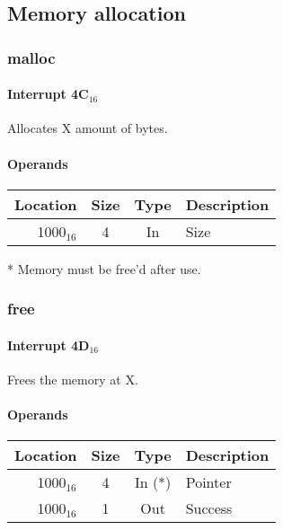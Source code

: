 \documentclass{article}
\begin{document}
\subsection{Memory allocation}

\subsubsection{malloc}

\paragraph{Interrupt 4C$_{16}$}

Allocates X amount of bytes.

\paragraph{Operands}

\begin{tabular}{|r|c|c|l|}
	\hline
	\textbf{Location} & \textbf{Size} & \textbf{Type} & \textbf{Description} \\
	\hline
	1000$_{16}$ & 4 & In & Size \\
	\hline
\end{tabular}

* Memory must be free'd after use.

\subsubsection{free}

\paragraph{Interrupt 4D$_{16}$}

Frees the memory at X.

\paragraph{Operands}

\begin{tabular}{|r|c|c|l|}
	\hline
	\textbf{Location} & \textbf{Size} & \textbf{Type} & \textbf{Description} \\
	\hline
	1000$_{16}$ & 4 & In (*) & Pointer \\
	\hline
	1000$_{16}$ & 1 & Out & Success \\
	\hline
\end{tabular}
\end{document}

